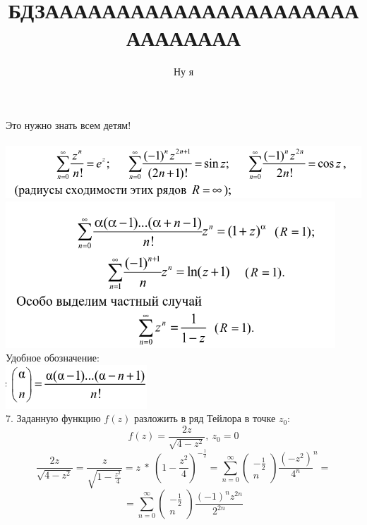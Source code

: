 \documentclass[14pt]{extarticle}
\title{БДЗАААААААААААААААААААААААААААААА}
\author{Ну я}
\begin{document}
\maketitle
Это нужно знать всем детям! \\\\
\includegraphics[width=450pt]{img1.png} \\
\includegraphics[width=350pt]{img2.png} \\
Удобное обозначение: \\
\includegraphics[width=150pt]{img3.png} \\

7. Заданную функцию $f(z)$ разложить в ряд Тейлора в точке $z_0$: 
$$f(z) = \frac{2z}{\sqrt{4-z^2}}, \ z_0 = 0$$
$$\frac{2z}{\sqrt{4-z^2}} = \frac{z}{\sqrt{1-\frac{z^2}{4}}}=
z \ * \ \left(1-\frac{z^2}{4}\right)^{-\frac{1}{2}}=
\sum_{n=0}^{\infty}\begin{pmatrix}
    -\frac{1}{2} \\
    n
\end{pmatrix}\frac{(-z^2)}{4^n}^n=$$
$$=
\sum_{n=0}^{\infty}\begin{pmatrix}
    -\frac{1}{2} \\
    n
\end{pmatrix}\frac{(-1)^n z^{2n}}{2^{2n}}$$
\end{document}
